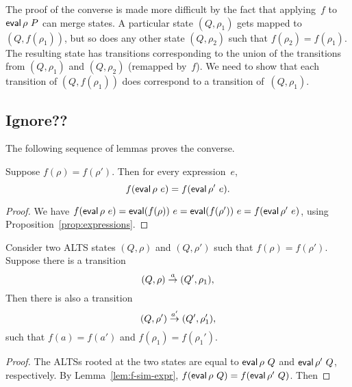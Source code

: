 The proof of the converse is made more difficult by the fact that applying~$f$
to $\mathop{\sf eval} \rho~P$ can merge states.  A particular state $(Q,\rho_1)$ gets
mapped to $(Q,f(\rho_1))$, but so does any other state $(Q,\rho_2)$ such that
$f(\rho_2) = f(\rho_1)$.  The resulting state has transitions corresponding to
the union of the transitions from $(Q,\rho_1)$ and $(Q,\rho_2)$ (remapped
by~$f$).  We need to show that each transition of $(Q,f(\rho_1))$ does
correspond to a transition of~$(Q,\rho_1)$. 








\subsection{Ignore?? }



%
The following sequence of lemmas proves the converse.
%
\begin{lemma}
\label{lem:f-sim-expr}
Suppose $f(\rho) = f(\rho')$.  Then for every expression~$e$,\,
\[
f(\mathop{\sf eval} \rho~e) =f(\mathop{\sf eval} \rho'~e).
\]
\end{lemma}
%
\begin{proof}
We have
\(
f(\mathop{\sf eval} \rho~e) = \mathop{\sf eval} (f(\rho))~e = \mathop{\sf eval} (f(\rho'))~e = f(\mathop{\sf eval} \rho'~e)
\),
using Proposition~\ref{prop:expressions}.
\end{proof}


\begin{lemma}
\label{lem:f-sim-proc}
Consider two ALTS states $(Q,\rho)$ and $(Q,\rho')$ such that $f(\rho) =
f(\rho')$.  Suppose there is a transition
\[
(Q,\rho) \stackrel{a}{\rightarrow} (Q',\rho_1),
\]
Then there is also a transition
\[
(Q,\rho') \stackrel{a'}{\rightarrow} (Q',\rho_1'),
\]
such that $f(a) = f(a')$ and $f(\rho_1) = f(\rho_1')$.
\end{lemma}
%
\begin{proof}
The ALTSs rooted at the two states are equal to $\mathop{\sf eval} \rho ~ Q$ and $\mathop{\sf eval}
\rho'~ Q$, respectively.  By Lemma~\ref{lem:f-sim-expr}, $f(\mathop{\sf eval} \rho~ Q) =
f(\mathop{\sf eval} \rho' ~Q)$.  Then 
\end{proof}


